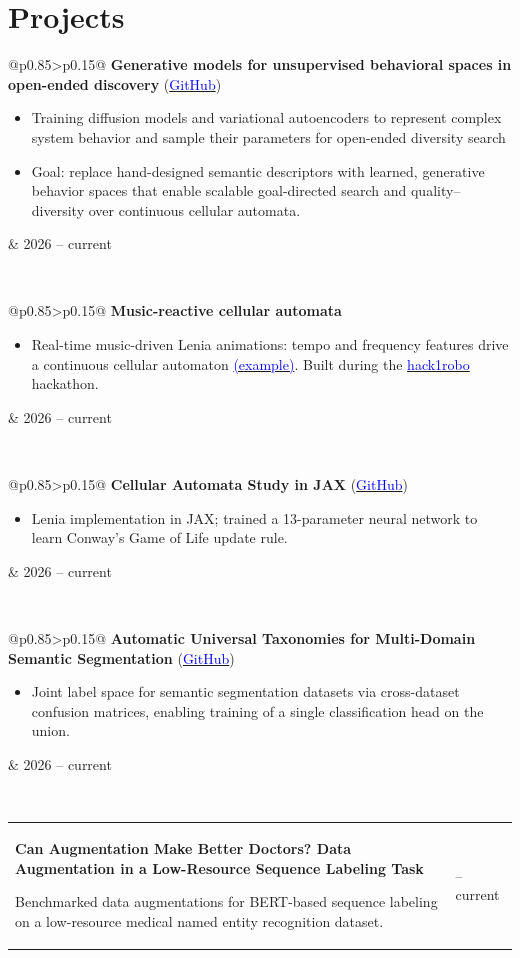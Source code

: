 \documentclass[a4paper]{article}
\makeatletter
\newlength{\tablewidth}
\newenvironment{period}[2]{%
\newcommand{\sarma}{#2}%
\setlength{\tablewidth}{\linewidth}
\addtolength{\tablewidth}{-2\tabcolsep}
\begin{tabular}{@{}p{0.85\tablewidth}>{\raggedleft\arraybackslash}p{0.15\tablewidth}@{}}%
#1 \newline
\begin{itemize}
}{%
\end{itemize} & \sarma \\%
\end{tabular}\\
}
\makeatother
\begin{document}
\section{Projects}


    \begin{period}{\textbf{Generative models for unsupervised behavioral spaces in open-ended discovery} (\href{https://github.com/markocvjetko/OE-discovery}{\textcolor{blue}{GitHub}})}{2026 -- current}
        \item Training diffusion models and variational autoencoders to represent complex system behavior and sample their parameters for open-ended diversity search
        \item Goal: replace hand-designed semantic descriptors with learned, generative behavior spaces that enable scalable goal-directed search and quality--diversity over continuous cellular automata.
    \end{period}

    \begin{period}{\textbf{Music-reactive cellular automata}}{Nov 2024}
        \item Real-time music-driven Lenia animations: tempo and frequency features drive a continuous cellular automaton \href{https://www.youtube.com/watch?v=M5BxJMfp3uk}{\textcolor{blue}{(example)}}. Built during the \href{https://sites.google.com/view/hack1robo/accueil}{\textcolor{blue}{hack1robo}} hackathon.
    \end{period}

    \begin{period}{\textbf{Cellular Automata Study in JAX} (\href{https://github.com/}{\textcolor{blue}{GitHub}})}{Jan -- Mar 2024}
        \item Lenia implementation in JAX; trained a 13-parameter neural network to learn Conway's Game of Life update rule.
    \end{period}

    \begin{period}{\textbf{Automatic Universal Taxonomies for Multi-Domain Semantic Segmentation} (\href{https://github.com/}{\textcolor{blue}{GitHub}})}{2023 -- 2024}
        \item Joint label space for semantic segmentation datasets via cross-dataset confusion matrices, enabling training of a single classification head on the union.
    \end{period}

    \begin{period}{\textbf{Can Augmentation Make Better Doctors? Data Augmentation in a Low-Resource Sequence Labeling Task}}{2022}
        Benchmarked data augmentations for BERT-based sequence labeling on a low-resource medical named entity recognition dataset.
    \end{period}
\end{document}

